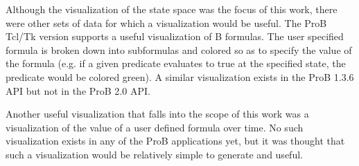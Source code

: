 Although the visualization of the state space was the focus of this work, there were other sets of data for which a visualization would be useful. The ProB Tcl/Tk version supports a useful visualization of B formulas. The user specified formula is broken down into subformulas and colored so as to specify the value of the formula (e.g. if a given predicate evaluates to true at the specified state, the predicate would be colored green). A similar visualization exists in the ProB 1.3.6 API but not in the ProB 2.0 API.

Another useful visualization that falls into the scope of this work was a visualization of the value of a user defined formula over time. No such visualization exists in any of the ProB applications yet, but it was thought that such a visualization would be relatively simple to generate and useful.